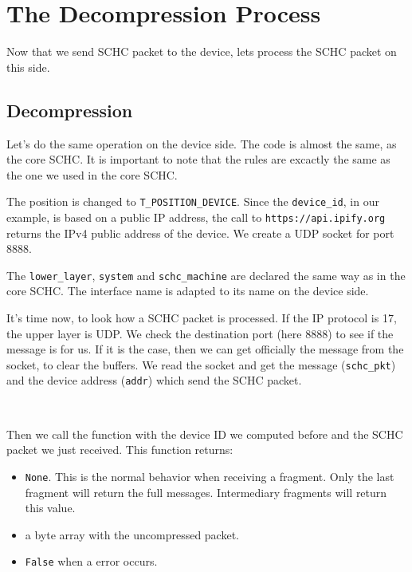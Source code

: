 \section{The Decompression Process}

 Now that we send SCHC packet to the device, lets process the SCHC packet on this side.
 
\subsection{Decompression}

Let's do the same operation on the device side. The code is almost the same, as the core SCHC. It is important to note that the rules are excactly the same as the one we used in the core SCHC.


The position is changed to \texttt{T\_POSITION\_DEVICE}.  Since the \texttt{device\_id}, in our example, is based on a public IP address, the call to \texttt{https://api.ipify.org} returns the IPv4 public address of the device. We create a UDP socket for port 8888.



The \texttt{lower\_layer}, \texttt{system} and \texttt{schc\_machine} are declared the same way as in the core SCHC.  The interface name is adapted to its name on the device side.



It's time now, to look how a SCHC packet is processed. If the IP protocol is 17, the upper layer is UDP. We check the destination port (here 8888) to see if the message is for us. If it is the case, then we can get officially the message from the socket, to clear the buffers. We read the socket and get the message (\texttt{schc\_pkt}) and the device address (\texttt{addr}) which send the SCHC packet. 

~~

Then we call the function  with the device ID we computed before and the SCHC packet we just received. This function  returns:
\begin{itemize}
    \item \texttt{None}. This is the normal behavior when receiving a fragment. Only the last fragment will return the full messages. Intermediary fragments will return this value.
    \item a byte array with the uncompressed packet.
    \item \texttt{False} when a error occurs.
\end{itemize}

